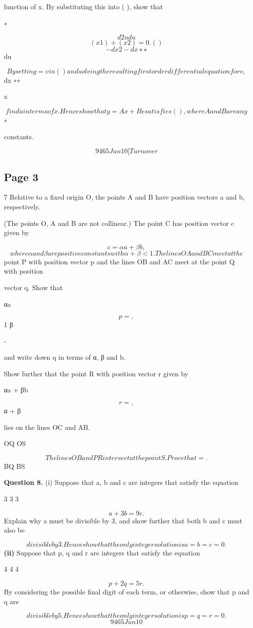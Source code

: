\documentclass[12pt]{article}
\begin{document}
\begin{flushleft}
function of x. By substituting this into ( ), show that\par
∗\par
\[d2u du\]
\[(x 1) + (x 2) = 0 . ( )\]
\[- dx2 - dx ∗∗\]
du\par
\[By setting = v in ( ) and solving the resulting first order differential equation for v,\]
dx ∗∗\par
x\par
\[find u in terms of x. Hence show that y = Ax + Be satisfies ( ), where A and B are any\]
∗\par
constants.\par
\[9465 Jun10 [Turn over\]
\end{flushleft}
\subsection*{Page 3}
\begin{flushleft}
7 Relative to a fixed origin O, the points A and B have position vectors a and b, respectively.\par
(The points O, A and B are not collinear.) The point C has position vector c given by\par
\[c = αa + βb ,\]
\[where α and β are positive constants with α + β < 1 . The lines OA and BC meet at the\]
point P with position vector p and the lines OB and AC meet at the point Q with position\par
vector q. Show that\par
αa\par
\[p = ,\]
1 β\par
-\par
and write down q in terms of α, β and b.\par
Show further that the point R with position vector r given by\par
αa + βb\par
\[r = ,\]
α + β\par
lies on the lines OC and AB.\par
OQ OS\par
\[The lines OB and P R intersect at the point S. Prove that = .\]
BQ BS\par
\bigskip\textbf{Question 8.} (i) Suppose that a, b and c are integers that satisfy the equation\par
3 3 3\par
\[a + 3b = 9c .\]
Explain why a must be divisible by 3, and show further that both b and c must also be\par
\[divisible by 3. Hence show that the only integer solution is a = b = c = 0 .\]
\textbf{(ii)} Suppose that p, q and r are integers that satisfy the equation\par
4 4 4\par
\[p + 2q = 5r .\]
By considering the possible final digit of each term, or otherwise, show that p and q are\par
\[divisible by 5. Hence show that the only integer solution is p = q = r = 0 .\]
\[9465 Jun10\]
\end{flushleft}
\end{document}
